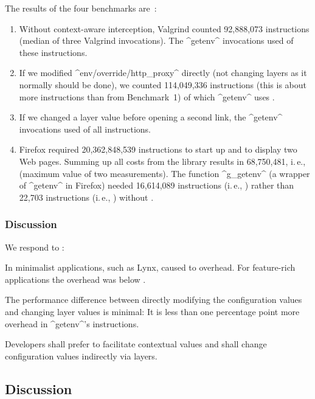 The results of the four benchmarks are~\cite{raab2017introducing}:
\begin{enumerate}
\item
Without context-aware interception, Valgrind counted 92,888,073 instructions (median of three Valgrind invocations).
The ^getenv^ invocations used  of these instructions.
\item
If we modified ^env/override/http_proxy^ directly (not changing layers as it normally should be done), we counted 114,049,336 instructions (this is about  more instructions than from Benchmark~1) of which ^getenv^ uses .
\item
If we changed a layer value before opening a second link, the ^getenv^ invocations used  of all instructions.
\item
Firefox required 20,362,848,539 instructions to start up and to display two Web pages.
Summing up all costs from the \elektra{} library results in 68,750,481, i.\,e.,  (maximum value of two measurements). %
The function ^g_getenv^ (a wrapper of ^getenv^ in Firefox) needed 16,614,089 instructions (i.\,e., ) rather than 22,703 instructions (i.\,e., ) without \elektra{}.
\end{enumerate}


\subsubsection{Discussion}

We respond to :
\rqUnmodifiedPerformance*

\begin{finding}
In minimalist applications, such as Lynx, \elektra{} caused  to  overhead.
For feature-rich applications the overhead was below .

The performance difference between directly modifying the configuration values and changing layer values is minimal:
It is less than one percentage point more overhead in ^getenv^'s instructions.
\begin{implication}
Developers shall prefer to facilitate contextual values and shall change configuration values indirectly via layers.
\end{implication}
\end{finding}






\subsection{Discussion}

